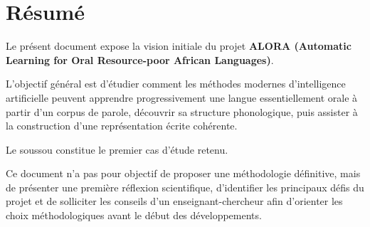 \documentclass[11pt,a4paper]{article}
\begin{document}
\section*{Résumé}


Le présent document expose la vision initiale du projet
\textbf{ALORA (Automatic Learning for Oral Resource-poor African Languages)}.

L'objectif général est d'étudier comment les méthodes modernes
d'intelligence artificielle peuvent apprendre progressivement une langue
essentiellement orale à partir d'un corpus de parole, découvrir sa
structure phonologique, puis assister à la construction d'une
représentation écrite cohérente.

Le soussou constitue le premier cas d'étude retenu.

Ce document n'a pas pour objectif de proposer une méthodologie
définitive, mais de présenter une première réflexion scientifique,
d'identifier les principaux défis du projet et de solliciter les conseils
d'un enseignant-chercheur afin d'orienter les choix méthodologiques avant
le début des développements.

\newpage













\newpage

\nocite{*}
\printbibliography

\end{document}
